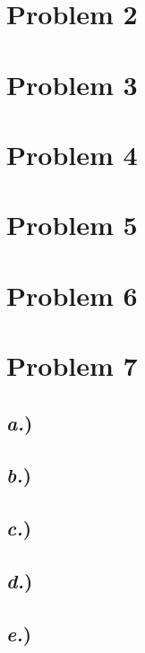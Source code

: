 \documentclass{article}
\begin{document}

\section*{Problem 2}





\section*{Problem 3}





\section*{Problem 4}




\section*{Problem 5}






\section*{Problem 6}






\section*{Problem 7}


\subsection*{\textit{a.})}
\subsection*{\textit{b.})}
\subsection*{\textit{c.})}
\subsection*{\textit{d.})}
\subsection*{\textit{e.})}



\end{document}
